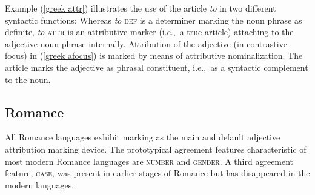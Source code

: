 Example (\ref{greek attr}) illustrates the use of the article \textit{to} in two different syntactic functions: Whereas \textit{to} \textsc{def} is a determiner marking the noun phrase as definite, \textit{to} \textsc{attr} is an attributive marker (i.e.,~a true article) attaching to the adjective noun phrase internally. Attribution of the adjective (in contrastive focus) in (\ref{greek afocus}) is marked by means of attributive nominalization. The article marks the adjective as phrasal constituent, i.e.,~as a syntactic complement to the noun.

\subsection{Romance}
All Romance languages exhibit  marking as the main and default adjective attribution marking device. The prototypical agreement features characteristic of most modern Romance languages are \textsc{number} and \textsc{gender}. A third agreement feature, \textsc{case}, was present in earlier stages of Romance but has disappeared in the modern languages.

